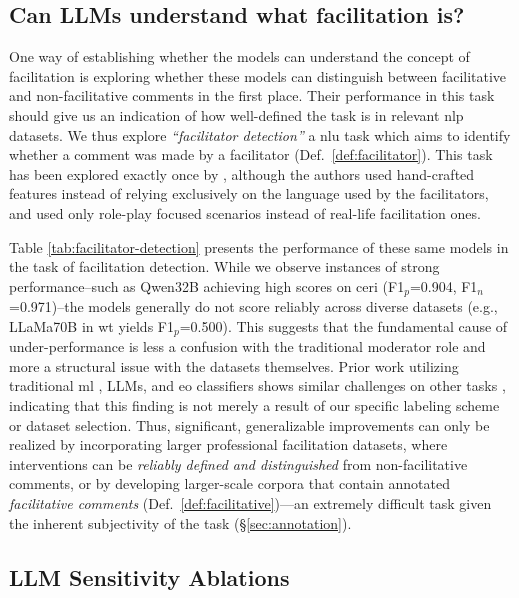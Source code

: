\documentclass[11pt]{article}
\theoremstyle{definition}
\theoremstyle{plain}
\begin{document}
\subsection{Can LLMs understand what facilitation is?}
\label{app:experiments:facilitator}

One way of establishing whether the models can understand the concept of facilitation is exploring whether these models can distinguish between facilitative and non-facilitative comments in the first place. Their performance in this task should give us an indication of how well-defined the task is in relevant \ac{nlp} datasets. We thus explore \emph{``facilitator detection''} a \ac{nlu} task which aims to identify whether a comment was made by a facilitator (Def.~\ref{def:facilitator}). This task has been explored exactly once by \citet{shiota2018_facilitators}, although the authors used hand-crafted features instead of relying exclusively on the language used by the facilitators, and used only role-play focused scenarios instead of real-life facilitation ones.

Table \ref{tab:facilitator-detection} presents the performance of these same models in the task of facilitation detection. While we observe instances of strong performance--such as Qwen32B achieving high scores on \ac{ceri} (F1$_p$=0.904, F1$_n$=0.971)--the models generally do not score reliably across diverse datasets (e.g., LLaMa70B in \ac{wt} yields F1$_p$=0.500). This suggests that the fundamental cause of under-performance is less a confusion with the traditional moderator role and more a structural issue with the datasets themselves. Prior work utilizing traditional \ac{ml} \citep{shiota2018_facilitators}, LLMs, and \ac{eo} classifiers shows similar challenges on other tasks \citep{chen-etal-2025-whow}, indicating that this finding is not merely a result of our specific labeling scheme or dataset selection. Thus, significant, generalizable improvements can only be realized by incorporating larger professional facilitation datasets, where interventions can be \emph{reliably defined and distinguished} from non-facilitative comments, or by developing larger-scale corpora that contain annotated \emph{facilitative comments} (Def.~\ref{def:facilitative})---an extremely difficult task given the inherent subjectivity of the task (\S\ref{sec:annotation}).


\subsection{LLM Sensitivity Ablations}
\label{app:experiments:ablations}
\end{document}
